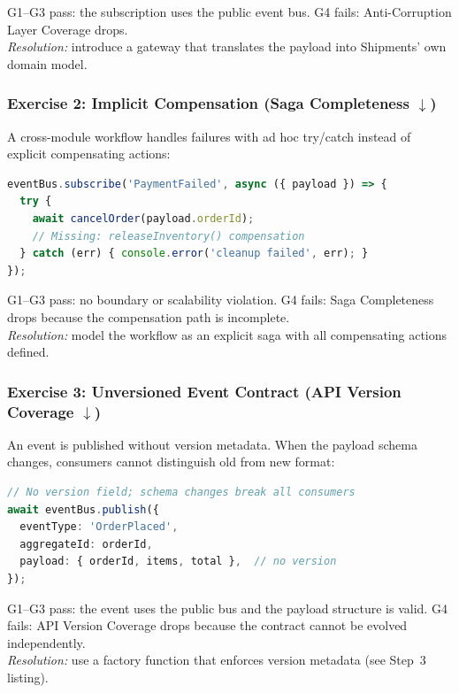 \noindent
G1--G3 pass: the subscription uses the public event bus. G4 fails: Anti-Corruption Layer Coverage drops.\\
\emph{Resolution:} introduce a gateway that translates the payload into Shipments' own domain model.

\subsubsection*{Exercise 2: Implicit Compensation (Saga Completeness $\downarrow$)}

A cross-module workflow handles failures with ad hoc try/catch instead of explicit compensating actions:

\begin{lstlisting}[basicstyle=\ttfamily\scriptsize,language=TypeScript,caption={Violation: ad hoc error handling instead of saga compensation},label={lst:g4-ex2-violation}]
eventBus.subscribe('PaymentFailed', async ({ payload }) => {
  try {
    await cancelOrder(payload.orderId);
    // Missing: releaseInventory() compensation
  } catch (err) { console.error('cleanup failed', err); }
});
\end{lstlisting}

\noindent
G1--G3 pass: no boundary or scalability violation. G4 fails: Saga Completeness drops because the compensation path is incomplete.\\
\emph{Resolution:} model the workflow as an explicit saga with all compensating actions defined.

\subsubsection*{Exercise 3: Unversioned Event Contract (API Version Coverage $\downarrow$)}

An event is published without version metadata. When the payload schema changes, consumers cannot distinguish old from new format:

\begin{lstlisting}[basicstyle=\ttfamily\scriptsize,language=TypeScript,caption={Violation: event without version metadata},label={lst:g4-ex3-violation}]
// No version field; schema changes break all consumers
await eventBus.publish({
  eventType: 'OrderPlaced',
  aggregateId: orderId,
  payload: { orderId, items, total },  // no version
});
\end{lstlisting}

\noindent
G1--G3 pass: the event uses the public bus and the payload structure is valid. G4 fails: API Version Coverage drops because the contract cannot be evolved independently.\\
\emph{Resolution:} use a factory function that enforces version metadata (see Step~3 listing).

